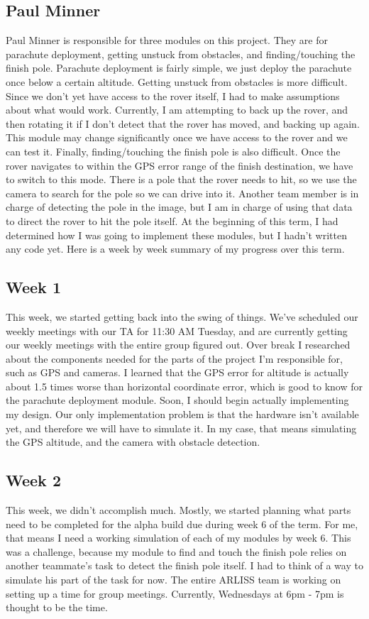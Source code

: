 \documentclass[10pt,letterpaper,onecolumn,draftclsnofoot,journal]{IEEEtran}
\begin{document}
\subsection{Paul Minner}
Paul Minner is responsible for three modules on this project. They are for parachute deployment, getting unstuck from obstacles, and finding/touching the finish pole. Parachute deployment is fairly simple, we just deploy the parachute once below a certain altitude. Getting unstuck from obstacles is more difficult. Since we don’t yet have access to the rover itself, I had to make assumptions about what would work. Currently, I am attempting to back up the rover, and then rotating it if I don’t detect that the rover has moved, and backing up again. This module may change significantly once we have access to the rover and we can test it. Finally, finding/touching the finish pole is also difficult. Once the rover navigates to within the GPS error range of the finish destination, we have to switch to this mode. There is a pole that the rover needs to hit, so we use the camera to search for the pole so we can drive into it. Another team member is in charge of detecting the pole in the image, but I am in charge of using that data to direct the rover to hit the pole itself. At the beginning of this term, I had determined how I was going to implement these modules, but I hadn’t written any code yet. Here is a week by week summary of my progress over this term. 
\subsection{Week 1}
This week, we started getting back into the swing of things. We've scheduled our weekly meetings with our TA for 11:30 AM Tuesday, and are currently getting our weekly meetings with the entire group figured out. Over break I researched about the components needed for the parts of the project I'm responsible for, such as GPS and cameras. I learned that the GPS error for altitude is actually about 1.5 times worse than horizontal coordinate error, which is good to know for the parachute deployment module. Soon, I should begin actually implementing my design. Our only implementation problem is that the hardware isn't available yet, and therefore we will have to simulate it. In my case, that means simulating the GPS altitude, and the camera with obstacle detection.
\subsection{Week 2}
This week, we didn't accomplish much. Mostly, we started planning what parts need to be completed for the alpha build due during week 6 of the term. For me, that means I need a working simulation of each of my modules by week 6. This was a challenge, because my module to find and touch the finish pole relies on another teammate’s task to detect the finish pole itself. I had to think of a way to simulate his part of the task for now. The entire ARLISS team is working on setting up a time for group meetings. Currently, Wednesdays at 6pm - 7pm is thought to be the time.
\end{document}
